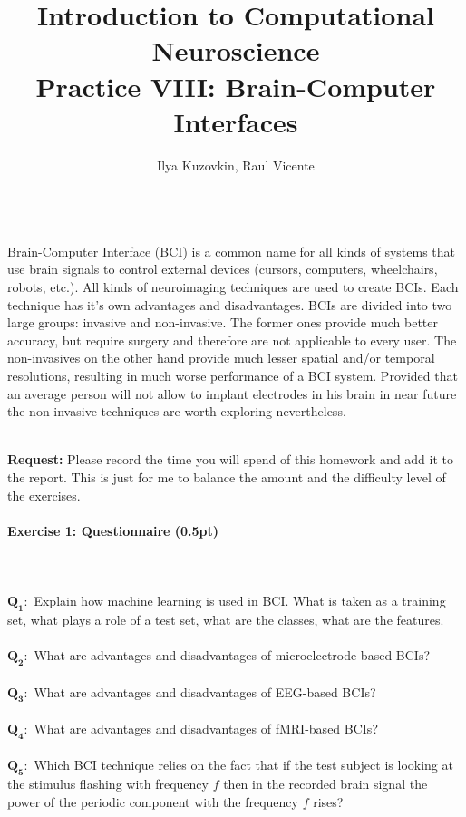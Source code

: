 \documentclass[a4paper,11pt]{article}
\author{\large{Ilya Kuzovkin, Raul Vicente}}
\title{\huge{Introduction to Computational Neuroscience}\\\LARGE{Practice VIII: Brain-Computer Interfaces}}
\newenvironment{exercise}[3]{\paragraph{Exercise #1: #2 (#3pt)}\ \\}{
\medskip}
\newcommand{\question}[2]{\setlength\parindent{0mm}\ \\$\mathbf{Q_{#1}:}$ #2\ \\}
\begin{document}
\maketitle


%
%
\ \\
Brain-Computer Interface (BCI) is a common name for all kinds of systems that use brain signals to control external devices (cursors, computers, wheelchairs, robots, etc.). All kinds of neuroimaging techniques are used to create BCIs. Each technique has it's own advantages and disadvantages. BCIs are divided into two large groups: invasive and non-invasive. The former ones provide much better accuracy, but require surgery and therefore are not applicable to every user. The non-invasives on the other hand provide much lesser spatial and/or temporal resolutions, resulting in much worse performance of a BCI system. Provided that an average person will not allow to implant electrodes in his brain in near future the non-invasive techniques are worth exploring nevertheless.

\ \\
\textbf{Request:} Please record the time you will spend of this homework and add it to the report. This is just for me to balance the amount and the difficulty level of the exercises.

%
%
\begin{exercise}{1}{Questionnaire}{0.5}
\question{1}{Explain how machine learning is used in BCI. What is taken as a training set, what plays a role of a test set, what are the classes, what are the features.}
\question{2}{What are advantages and disadvantages of microelectrode-based BCIs?}
\question{3}{What are advantages and disadvantages of EEG-based BCIs?}
\question{4}{What are advantages and disadvantages of fMRI-based BCIs?}
\question{5}{Which BCI technique relies on the fact that if the test subject is looking at the stimulus flashing with frequency $f$ then in the recorded brain signal the power of the periodic component with the frequency $f$ rises?}
\end{exercise}
\end{document}
